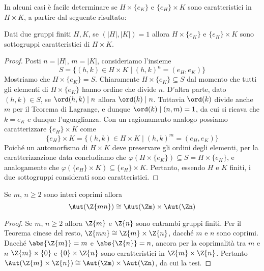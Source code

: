 \documentclass[11pt]{scrartcl}
\begin{document}
	In alcuni casi è facile determinare se $H\times\{e_K\}$ e $\{e_H\}\times K$
	sono caratteristici in $H\times K$, a partire dal seguente risultato:
	
	\begin{proposition}
		Dati due gruppi finiti $H, K$, se $(\lvert H \rvert, \lvert K \rvert) = 1$ allora $H\times\{e_K\}$
		e $\{e_H\}\times K$ sono sottogruppi caratteristici di $H\times K$.
	\end{proposition}
	
	\begin{proof}
		Posti $n = \lvert H \rvert$, $m = \lvert K \rvert$, consideriamo l'insieme
		\[
		S = \{(h, k) \in H\times K\mid (h, k)^n = (e_H, e_K)\}\]
		Mostriamo che $H\times \{e_K\} = S$. Chiaramente 
		$H\times \{e_K\} \subseteq S$ dal momento che tutti gli elementi di $H\times\{e_K\}$
		hanno ordine che divide $n$. D'altra parte, dato $(h, k) \in S$, se
		$\ord(h, k) \mid n$ allora $\ord(k)\mid n$. Tuttavia 
		$\ord(k)$ divide anche $m$ per il Teorema di Lagrange, e dunque
		$\ord(k) \mid (n, m) = 1$, da cui si ricava che $k = e_K$ e dunque l'uguaglianza. Con un ragionamento
		analogo possiamo caratterizzare $\{e_H\} \times K$ come 
		\[
		\{e_H\} \times K = \{(h, k) \in H\times K\mid (h, k)^m = (e_H, e_K)\}
		\] Poiché un automorfismo di $H\times K$ deve preservare gli ordini degli
		elementi, per la caratterizzazione data concludiamo che
		$\varphi(H \times \{e_K\}) \subseteq S = H \times \{e_K\}$, e analogamente
		che $\varphi(\{e_H\} \times K) \subseteq \{e_H\} \times K$. Pertanto,
		essendo $H$ e $K$ finiti, i due sottogruppi considerati sono caratteristici.
	\end{proof}
	
	\begin{corollary}
		Se $m$, $n \geq 2$ sono interi coprimi allora
		\[
		\Aut(\Z{mn}) \cong \Aut(\Zm)\times \Aut(\Zn)
		\]
	\end{corollary}
	
	\begin{proof}
		Se $m$, $n \geq 2$ allora $\Z{m}$ e $\Z{n}$ sono entrambi gruppi finiti.
		Per il Teorema cinese del resto, $\Z{mn} \cong \Z{m} \times \Z{n}$, dacché
		$m$ e $n$ sono coprimi. Dacché $\abs{\Z{m}} = m$ e $\abs{\Z{n}} = n$, ancora
		per la coprimalità tra $m$ e $n$
		$\Z{m} \times \{0\}$ e $\{0\} \times \Z{n}$ sono caratteristici in
		$\Z{m} \times \Z{n}$. Pertanto $\Aut(\Z{m} \times \Z{n}) \cong
		\Aut(\Zm) \times \Aut(\Zn)$, da cui la tesi.
	\end{proof}
	
\end{document}
